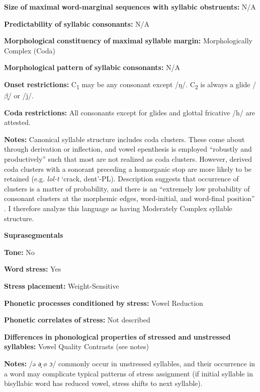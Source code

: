 \textbf{Size} \textbf{of} \textbf{maximal} \textbf{word{}-marginal sequences with syllabic obstruents:} N/A

\textbf{Predictability} \textbf{of} \textbf{syllabic} \textbf{consonants:} N/A

\textbf{Morphological} \textbf{constituency} \textbf{of} \textbf{maximal} \textbf{syllable} \textbf{margin:} Morphologically Complex (Coda)

\textbf{Morphological} \textbf{pattern} \textbf{of} \textbf{syllabic} \textbf{consonants:} N/A

\textbf{Onset} \textbf{restrictions:} C\textsubscript{1} may be any consonant except /ŋ/. C\textsubscript{2} is always a glide /$\beta ̞$/ or /j/.

\textbf{Coda} \textbf{restrictions:} All consonants except for glides and glottal fricative /h/ are attested. 

\textbf{Notes:} Canonical syllable structure includes coda clusters. These come about through derivation or inflection, and vowel epenthesis is employed “robustly and productively” such that most are not realized as coda clusters. However, derived coda clusters with a sonorant preceding a homorganic stop are more likely to be retained (e.g. \textit{lol-t} ‘crack, dent’-PL). Description suggests that occurrence of clusters is a matter of probability, and there is an “extremely low probability of consonant clusters at the morphemic edges, word-initial, and word-final position” \citep[55]{Filchenko2007}. I therefore analyze this language as having Moderately Complex syllable structure.

\textbf{Suprasegmentals}

\textbf{Tone:} No

\textbf{Word} \textbf{stress:} Yes

\textbf{Stress} \textbf{placement:} Weight-Sensitive

\textbf{Phonetic} \textbf{processes} \textbf{conditioned} \textbf{by} \textbf{stress:} Vowel Reduction

\textbf{Phonetic} \textbf{correlates} \textbf{of} \textbf{stress:} Not described

\textbf{Differences} \textbf{in} \textbf{phonological} \textbf{properties} \textbf{of} \textbf{stressed} \textbf{and} \textbf{unstressed} \textbf{syllables:} Vowel Quality Contrasts (see notes)

\textbf{Notes:} /ə ə̘ ø ɔ/ commonly occur in unstressed syllables, and their occurrence in a word may complicate typical patterns of stress assignment (if initial syllable in bisyllabic word has reduced vowel, stress shifts to next syllable).

